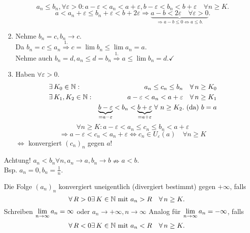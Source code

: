\documentclass[../ana1.tex]{subfiles}
\begin{document}
\begin{bew}
\begin{enumerate}
		\[ a_n \leq b_n, \forall \varepsilon > 0: a-\varepsilon < a_n<a + \varepsilon, b-\varepsilon < b_n < b + \varepsilon \quad \forall n\geq K. \]
		\[ a < a_n + \varepsilon \leq b_n + \varepsilon < b + 2\varepsilon \Rightarrow \underbrace{a-b < 2\varepsilon \quad \forall \varepsilon > 0}_{\Rightarrow a-b\leq 0 \Leftrightarrow a\leq b.}. \]
		\item Nehme \(b_n = c, b_n \rightarrow c\).\\
		Da \(b_n = c \leq a_n \overset{1.}{\Rightarrow} c= \lim b_n \leq \lim a_n = a \).\\
		Nehme auch \(b_n = d, a_n \leq d = b_n \overset{1.}{\Rightarrow} a \leq \lim b_n = d. \checkmark \)
		\item Haben \(\forall \varepsilon > 0\).
		\begin{align*}
			&\exists K_0 \in\N: &a_n \leq c_n \leq b_n \quad \forall n\geq K_0\\
			&\exists K_1, K_2 \in\N: &a-\varepsilon < a_n < a + \varepsilon \quad \forall n\geq K_1\\
			&&\underbrace{b-\varepsilon}_{=a-\varepsilon} < b_n < \underbrace{b + \varepsilon}_{=a+\varepsilon} \, \forall \, n \geq K_2. \text{ (da) }b=a
		\end{align*}
		\[\forall  n\geq K: a-\varepsilon < a_n \leq c_n \leq b_n < a+\varepsilon \]
		\[ \Rightarrow a-\varepsilon < c_n < a_n + \varepsilon \Leftrightarrow c_n\in U_\varepsilon(a) \quad \forall n\geq K \] 
		\( \Leftrightarrow \) konvergiert \( {(c_n)}_n \) gegen \( a \)!
	\end{enumerate}
\end{bew}

Achtung! \( a_n < b_n \forall n, a_n \rightarrow a, b_n \rightarrow b \nRightarrow  a<b\).\\
Bsp. \(a_n = 0, b_n = \frac{1}{n}\).

\begin{defi}
	Die Folge \( {(a_n)}_n \) konvergiert uneigentlich (divergiert bestimmt) gegen \(+\infty \), falls 
	\[ \forall R>0 \exists K\in\N \text{ mit } a_n >R \quad \forall n\geq K. \]
	Schreiben \( \lim\limits_{n\rightarrow\infty} a_n = \infty \) oder \( a_n \rightarrow +\infty, n\rightarrow \infty \)
	Analog für \( \lim\limits_{n\rightarrow\infty} a_n = -\infty \), falls 
	\[ \forall R<0 \exists K\in\N \text{ mit } a_n < R \quad \forall n\geq K. \]
\end{defi}
\end{document}
